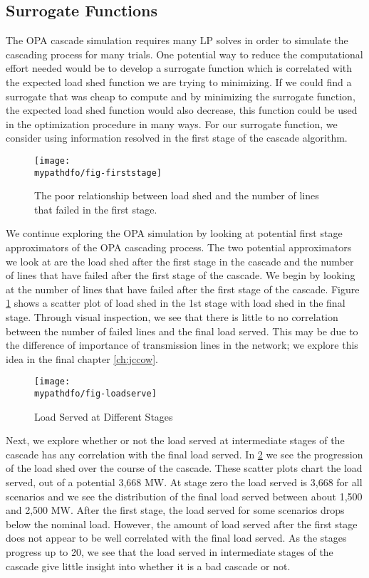 \subsection{Surrogate Functions}
The OPA cascade simulation requires many LP solves in order to simulate the cascading process for many trials.  One potential way to reduce the computational effort needed would be to develop a surrogate function which is correlated with the expected load shed function we are trying to minimizing.  If we could find a surrogate that was cheap to compute and by minimizing the surrogate function, the expected load shed function would also decrease, this function could be used in the optimization procedure in many ways.   For our surrogate function, we consider using information resolved in the first stage of the cascade algorithm.

\begin{figure}
\centering
\texttt{[image: \\mypathdfo/fig-firststage]}
\caption[Lack of correlation between load shed and first stage line failures]{The poor relationship between load shed and the number of lines that failed in the first stage.}
\label{fig:first}
\end{figure}


We continue exploring the OPA simulation by looking at potential first stage approximators of the OPA cascading process. The two potential approximators we look at are the load shed after the first stage in the cascade and the number of lines that have failed after the first stage of the cascade.  We begin by looking at the number of lines that have failed after the first stage of the cascade. Figure \ref{fig:first} shows a scatter plot of load shed in the 1st stage with load shed in the final stage.  Through visual inspection, we see that there is little to no correlation between the number of failed lines and the final load served.  This may be due to the difference of importance of transmission lines in the network; we explore this idea in the final chapter \cref{ch:jccow}.


\begin{figure}
\centering
\texttt{[image: \\mypathdfo/fig-loadserve]}
 \caption{Load Served at Different Stages}\label{fig:loadserve}
\end{figure}


Next, we explore whether or not the load served at intermediate stages of the cascade has any correlation with the final load served. In \cref{fig:loadserve} we see the progression of the load shed over the course of the cascade.  These scatter plots chart the load served, out of a potential 3,668 MW.  At stage zero the load served is 3,668 for all scenarios and we see the distribution of the final load served between about 1,500 and 2,500 MW.  After the first stage, the load served for some scenarios drops below the nominal load.  However, the amount of load served after the first stage does not appear to be well correlated with the final load served.  As the stages progress up to 20, we see that the load served in intermediate stages of the cascade give little insight into whether it is a bad cascade or not.  


